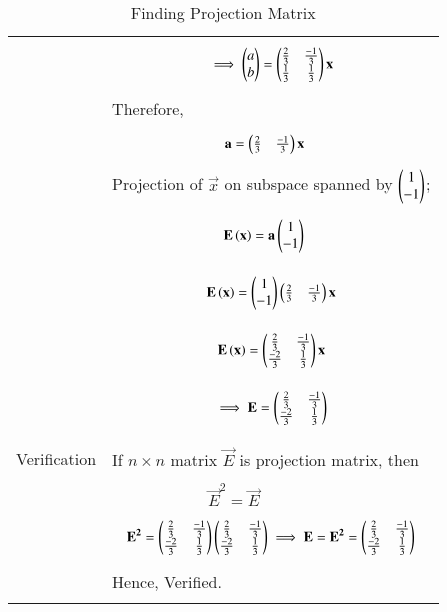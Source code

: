 \documentclass[journal,12pt]{IEEEtran}
\begin{document}
\begin{longtable}{|p{4cm}|p{14cm}|}
       
       
       &
       {\begin{align}
       \implies \begin{pmatrix}a\\b\end{pmatrix} = \begin{pmatrix}\frac{2}{3}&\frac{-1}{3}\\\frac{1}{3}&\frac{1}{3}\end{pmatrix}\mathbf{x}
       \end{align}}\\
       & Therefore,\\
       &{\begin{align}
          \mathbf{a} &=\begin{pmatrix}\frac{2}{3}&\frac{-1}{3}\end{pmatrix}\mathbf{x}
       \end{align}}\\
       
     & Projection of $\vec{x}$ on subspace spanned by $\begin{pmatrix}1\\-1\end{pmatrix}$;\\
     &
     {\begin{align}
     & \mathbf{E}\left(\mathbf{x}\right) = \mathbf{a}\begin{pmatrix}1\\-1\end{pmatrix}
     \end{align}}\\
     &
     {\begin{align}
       \mathbf{E}\left(\mathbf{x}\right) = \begin{pmatrix}1\\-1\end{pmatrix}\begin{pmatrix}\frac{2}{3}& \frac{-1}{3}\end{pmatrix}\mathbf{x}
       \end{align}}\\
       &{\begin{align}
     \mathbf{E}\left(\mathbf{x}\right) = \begin{pmatrix}\frac{2}{3}&\frac{-1}{3}\\\frac{-2}{3}&\frac{1}{3}\end{pmatrix}\mathbf{x}
      \end{align}}\\
      &{\begin{align}
      \implies{ \mathbf{E}= \ensuremath{\begin{pmatrix}\frac{2}{3}&\frac{-1}{3}\\\frac{-2}{3}& \frac{1}{3}\end{pmatrix}}}
      \end{align}}\\
       \hline
       \multirow{3}{*}{Verification} & \\
& If $n\times n$ matrix $\vec{E}$ is projection matrix, then\\
	&\\
	&$\qquad\qquad\qquad \vec{E}^2=\vec{E}$\\
  &{\begin{align}
  \mathbf{E^{2}} = \begin{pmatrix}\frac{2}{3}&\frac{-1}{3}\\\frac{-2}{3}& \frac{1}{3}\end{pmatrix}\begin{pmatrix}\frac{2}{3}&\frac{-1}{3}\\\frac{-2}{3}& \frac{1}{3}\end{pmatrix}
  \implies \mathbf{E}=\mathbf{E^{2}}=\begin{pmatrix}\frac{2}{3}&\frac{-1}{3}\\\frac{-2}{3}& \frac{1}{3}\end{pmatrix}
  \end{align}}\\
  & Hence, Verified.\\
  \hline
\caption{Finding Projection Matrix}
\label{table:1}	
\end{longtable}
\end{document}
